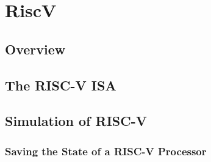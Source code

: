 \chapter{RiscV}\label{chap:riscv}

\section{Overview}

\section{The RISC-V ISA}

\section{Simulation of RISC-V}

\subsection{Saving the State of a RISC-V Processor}\label{statefile}